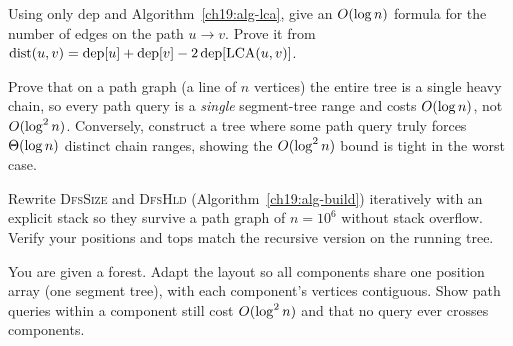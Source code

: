 \begin{exercise}
Using only $\mathrm{dep}$ and Algorithm~\ref{ch19:alg-lca}, give an $O(\log n)$ formula for the
number of edges on the path $u\!\to\!v$. Prove it from
$\operatorname{dist}(u,v)=\mathrm{dep}[u]+\mathrm{dep}[v]-2\,\mathrm{dep}[\mathrm{LCA}(u,v)]$.
\end{exercise}

\begin{exercise}
Prove that on a path graph (a line of $n$ vertices) the entire tree is a single heavy chain, so every
path query is a \emph{single} segment-tree range and costs $O(\log n)$, not $O(\log^2 n)$.
Conversely, construct a tree where some path query truly forces $\Theta(\log n)$ distinct chain ranges,
showing the $O(\log^2 n)$ bound is tight in the worst case.
\end{exercise}

\begin{exercise}
Rewrite \textsc{DfsSize} and \textsc{DfsHld} (Algorithm~\ref{ch19:alg-build}) iteratively with an
explicit stack so they survive a path graph of $n=10^6$ without stack overflow. Verify your positions
and tops match the recursive version on the running tree.
\end{exercise}

\begin{exercise}
You are given a forest. Adapt the layout so all components share one position array (one segment
tree), with each component's vertices contiguous. Show path queries within a component still cost
$O(\log^2 n)$ and that no query ever crosses components.
\end{exercise}
